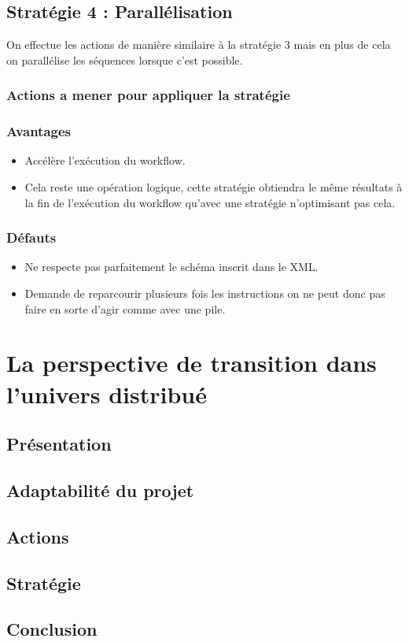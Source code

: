 \documentclass{article}
\begin{document}
\subsection{Stratégie 4 : Parallélisation}
On effectue les actions de manière similaire à la stratégie 3 mais en plus de cela on parallélise les séquences lorsque c'est possible.
\subsubsection{Actions a mener pour appliquer la stratégie}

\subsubsection{Avantages}
\begin{itemize}
    \item Accélère l'exécution du workflow.
    \item Cela reste une opération logique, cette stratégie obtiendra le même résultats à la fin de l'exécution du workflow qu'avec une stratégie n'optimisant pas cela.
\end{itemize}

\subsubsection{Défauts}
\begin{itemize}
    \item Ne respecte pas parfaitement le schéma inscrit dans le XML.
    \item Demande de reparcourir plusieurs fois les instructions on ne peut donc pas faire en sorte d'agir comme avec une pile.
\end{itemize}
\pagebreak

\section{La perspective de transition dans l'univers distribué}
\subsection{Présentation}
\subsection{Adaptabilité du projet}
\subsection{Actions}
\subsection{Stratégie}
\subsection{Conclusion}

\fi
\end{document}
